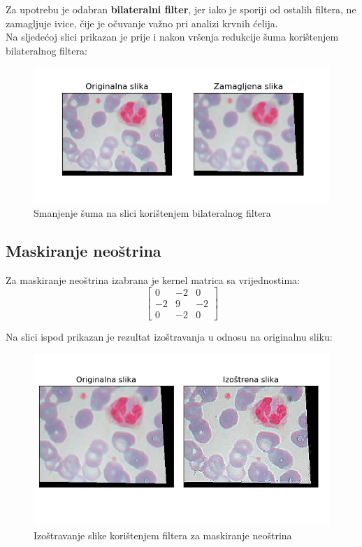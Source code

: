 \documentclass[12pt,a4paper]{article}
\begin{document}
Za upotrebu je odabran \textbf{bilateralni filter}, jer iako je sporiji od ostalih filtera, ne zamagljuje ivice, čije je očuvanje važno pri analizi krvnih ćelija. \\

Na sljedećoj slici prikazan je prije i nakon vršenja redukcije šuma korištenjem bilateralnog filtera:

\begin{figure}[H]

\center
\includegraphics[scale=0.9]{s1SmanjenjeSuma.png}
\caption{Smanjenje šuma na slici korištenjem bilateralnog filtera}

\end{figure}

\newpage

\subsection{Maskiranje neoštrina}

Za maskiranje neoštrina izabrana je kernel matrica sa vrijednostima:
\[
\begin{bmatrix}
    0 & -2 & 0 \\
    -2 & 9 & -2 \\
    0 & -2 & 0
\end{bmatrix}
\]

Na slici ispod prikazan je rezultat izoštravanja u odnosu na originalnu sliku:


\begin{figure}[H]

\center
\includegraphics[scale=0.9]{s2MaskiranjeNeostrina.png}
\caption{Izoštravanje slike korištenjem filtera za maskiranje neoštrina}
	
\end{figure}
\end{document}
